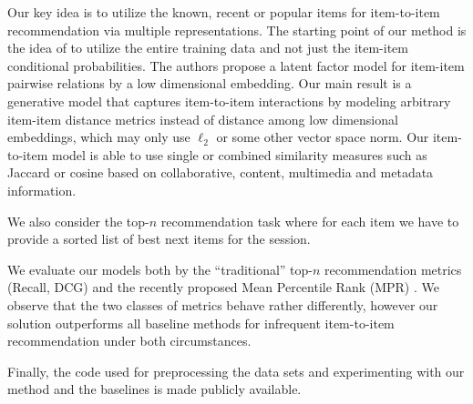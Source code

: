 Our key idea is to utilize the known, recent or popular items for item-to-item recommendation via multiple representations. The starting point of our method is the idea of \cite{koenigstein2013towards} to utilize the entire training data and not just the item-item conditional probabilities.
The authors propose a latent factor model for item-item pairwise relations by a low dimensional embedding. Our main result is a generative model that captures item-to-item interactions by modeling arbitrary item-item distance metrics instead of distance among low dimensional embeddings, which may only use $\ell_2$ or some other vector space norm. 
Our item-to-item model is able to use single or combined similarity measures such as Jaccard or cosine based on collaborative, content, multimedia and metadata information. 


We also consider the top-$n$ recommendation task \cite{deshpande2004item} where for each item we have to provide a sorted list of best next items for the session.

We evaluate our models both by the ``traditional'' top-$n$ recommendation metrics (Recall, DCG) and the recently proposed Mean Percentile Rank (MPR) \cite{hu2008collaborative}.
We observe that the two classes of metrics behave rather differently, however our solution outperforms all baseline methods for infrequent item-to-item recommendation under both circumstances.

Finally, the code used for preprocessing the data sets and experimenting with our method and the baselines is made publicly available.



